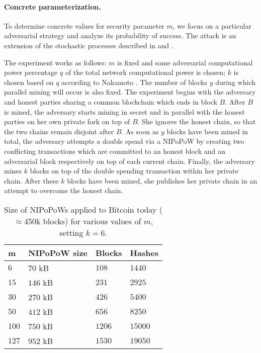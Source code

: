 \paragraph{Concrete parameterization.}
To determine concrete values for security parameter $m$, we focus on a
particular adversarial strategy and analyze its probability of success.
The attack is an extension of the stochastic processes described in
\cite{bitcoin} and \cite{rosenfeld}.

The experiment works as follows: $m$ is fixed and some adversarial computational
power percentage $q$ of the total network computational power is chosen; $k$ is
chosen based on $q$ according to Nakamoto \cite{bitcoin}. The number of blocks
$y$ during which parallel mining will occur is also fixed. The experiment begins
with the adversary and honest parties sharing a common blockchain which ends in
block $B$. After $B$ is mined, the adversary starts mining in secret and in
parallel with the honest parties on her own private fork on top of $B$. She
ignores the honest chain, so that the two chains remain disjoint after $B$. As
soon as $y$ blocks have been mined in total, the adversary attempts a double
spend via a NIPoPoW
by creating two conflicting transactions which are committed to an honest
block and an adversarial block respectively on top of each current chain.
Finally, the adversary mines $k$ blocks on top of the double spending
transaction within her private chain. After these $k$ blocks have been mined,
she publishes her private chain in an attempt to overcome the honest chain.


\begin{table}
  \caption{
    \label{table.size}
    Size of NIPoPoWs applied to Bitcoin today
    ($\approx$450k blocks) for various values of $m$,
    setting $k = 6$.
  }
  \centering
  \begin{tabular}{l|l|l|l}
      {\bf m}  & {\bf NIPoPoW size} & {\bf Blocks} & {\bf
      Hashes}\\
      \hline
      $6$   & $70$  kB & $108$ & $1440$  \\
      $15$  & $146$ kB & $231$ & $2925$  \\
      $30$  & $270$ kB & $426$ & $5400$  \\
      $50$  & $412$ kB & $656$ & $8250$ \\
      $100$ & $750$ kB & $1206$ & $15000$ \\
      $127$ & $952$ kB & $1530$ & $19050$ \\
  \end{tabular}
\end{table}



